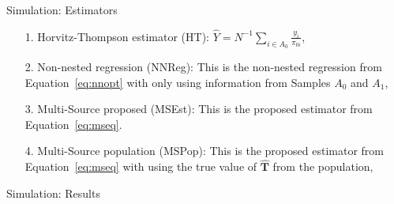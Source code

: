 \documentclass{beamer} %
\renewcommand{\bf}[1]{\mathbf{#1}}
\begin{document}
\begin{frame}{Simulation: Estimators}

\begin{itemize}
  \item[1.] Horvitz-Thompson estimator (HT): $\hat Y = N^{-1} \sum_{i \in A_0}
    \frac{y_i}{\pi_{0i}}$,
  \item[2.] Non-nested regression (NNReg): This is the non-nested regression from
    Equation~\eqref{eq:nnopt} with only using information from Samples $A_0$ and
    $A_1$,
  \item[3.] Multi-Source proposed (MSEst): This is the proposed estimator from
    Equation~\eqref{eq:mseq}.
  \item[4.] Multi-Source population (MSPop): This is the proposed estimator from
    Equation~\eqref{eq:mseq} with
    using the true value of $\hat{\bf T}$ from the population,
\end{itemize}

\end{frame}

\begin{frame}{Simulation: Results}

\begin{table}[ht!]
  \centering
  
\caption{This table shows the results of the simulation study. It displays the
Bias, RMSE, empirical 95\% confidence interval, and a t-statistic assessing the
unbiasedness of each estimator for the estimators: HT, NNReg, MSPop, MSEst, and
MSReg.}
\label{tab:msdc-mean}
\end{table}

\end{frame}
\end{document}
